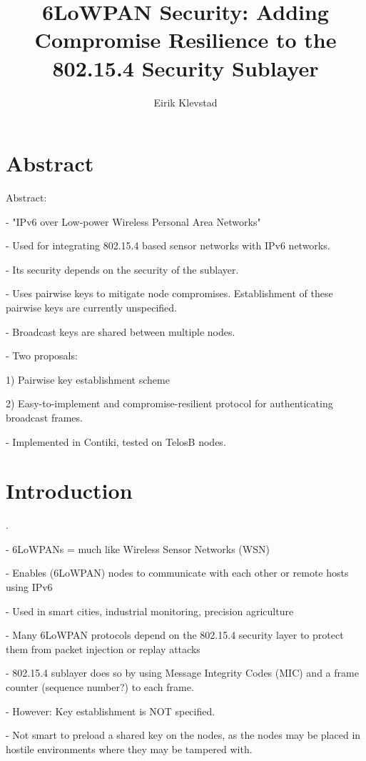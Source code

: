 \documentclass[10pt]{article}
\begin{document}
\author{Eirik Klevstad}
\title{6LoWPAN Security: Adding Compromise Resilience to the 802.15.4 Security Sublayer}
\maketitle

\section{Abstract}
Abstract: 

- "IPv6 over Low-power Wireless Personal Area Networks"

- Used for integrating 802.15.4 based sensor networks with IPv6 networks.

- Its security depends on the security of the sublayer.

- Uses pairwise keys to mitigate node compromises. Establishment of these pairwise keys are currently unspecified.

- Broadcast keys are shared between multiple nodes. 

- Two proposals:

1) Pairwise key establishment scheme

2) Easy-to-implement and compromise-resilient protocol for authenticating broadcast frames.

- Implemented in Contiki, tested on TelosB nodes.


\section{Introduction}
.

- 6LoWPANs = much like Wireless Sensor Networks (WSN)

- Enables (6LoWPAN) nodes to communicate with each other or remote hosts using IPv6

- Used in smart cities, industrial monitoring, precision agriculture

- Many 6LoWPAN protocols depend on the 802.15.4 security layer to protect them from packet injection or replay attacks

- 802.15.4 sublayer does so by using Message Integrity Codes (MIC) and a frame counter (sequence number?) to each frame.

- However: Key establishment is NOT specified.

- Not smart to preload a shared key on the nodes, as the nodes may be placed in hostile environments where they may be tampered with.
\end{document}
